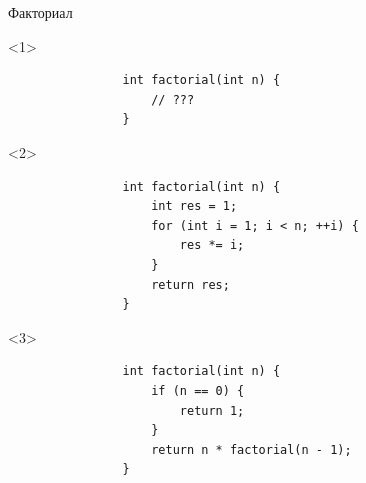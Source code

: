 \documentclass[aspectratio=169,14pt]{beamer}
\begin{document}
    \begin{frame}[fragile]{Факториал}
        \begin{onlyenv}<1>
            \begin{verbatim}
                int factorial(int n) {
                    // ???
                }
            \end{verbatim}
        \end{onlyenv}
        \begin{onlyenv}<2>
            \begin{verbatim}
                int factorial(int n) {
                    int res = 1;
                    for (int i = 1; i < n; ++i) {
                        res *= i;
                    }
                    return res;
                }
            \end{verbatim}
        \end{onlyenv}
        \begin{onlyenv}<3>
            \begin{verbatim}
                int factorial(int n) {
                    if (n == 0) {
                        return 1;
                    }
                    return n * factorial(n - 1);
                }
            \end{verbatim}
        \end{onlyenv}
    \end{frame}
\end{document}
